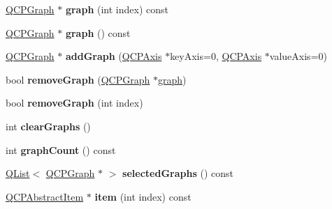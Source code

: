 \begin{DoxyCompactItemize}
\item 
\hyperlink{class_q_c_p_graph}{Q\+C\+P\+Graph} $\ast$ {\bfseries graph} (int index) const \hypertarget{class_q_custom_plot_a92870be7fd907ded84f97620b0189275}{}\label{class_q_custom_plot_a92870be7fd907ded84f97620b0189275}

\item 
\hyperlink{class_q_c_p_graph}{Q\+C\+P\+Graph} $\ast$ {\bfseries graph} () const \hypertarget{class_q_custom_plot_aa4284024fdbebf141788aa6d5d66d286}{}\label{class_q_custom_plot_aa4284024fdbebf141788aa6d5d66d286}

\item 
\hyperlink{class_q_c_p_graph}{Q\+C\+P\+Graph} $\ast$ {\bfseries add\+Graph} (\hyperlink{class_q_c_p_axis}{Q\+C\+P\+Axis} $\ast$key\+Axis=0, \hyperlink{class_q_c_p_axis}{Q\+C\+P\+Axis} $\ast$value\+Axis=0)\hypertarget{class_q_custom_plot_a81da9c07843d3e2beb1133dadb49acfc}{}\label{class_q_custom_plot_a81da9c07843d3e2beb1133dadb49acfc}

\item 
bool {\bfseries remove\+Graph} (\hyperlink{class_q_c_p_graph}{Q\+C\+P\+Graph} $\ast$\hyperlink{class_q_custom_plot_a6d3ed93c2bf46ab7fa670d66be4cddaf}{graph})\hypertarget{class_q_custom_plot_a903561be895fb6528a770d66ac5e6713}{}\label{class_q_custom_plot_a903561be895fb6528a770d66ac5e6713}

\item 
bool {\bfseries remove\+Graph} (int index)\hypertarget{class_q_custom_plot_a9554b3d2d5b10c0f884bd4010b6c192c}{}\label{class_q_custom_plot_a9554b3d2d5b10c0f884bd4010b6c192c}

\item 
int {\bfseries clear\+Graphs} ()\hypertarget{class_q_custom_plot_ab0f3abff2d2f7df3668b5836f39207fa}{}\label{class_q_custom_plot_ab0f3abff2d2f7df3668b5836f39207fa}

\item 
int {\bfseries graph\+Count} () const \hypertarget{class_q_custom_plot_a7d9b4d19114b2fde60f0233eeb0aa682}{}\label{class_q_custom_plot_a7d9b4d19114b2fde60f0233eeb0aa682}

\item 
\hyperlink{class_q_list}{Q\+List}$<$ \hyperlink{class_q_c_p_graph}{Q\+C\+P\+Graph} $\ast$ $>$ {\bfseries selected\+Graphs} () const \hypertarget{class_q_custom_plot_a70f84dc15f70b91c1fb3ff18e03ddaaf}{}\label{class_q_custom_plot_a70f84dc15f70b91c1fb3ff18e03ddaaf}

\item 
\hyperlink{class_q_c_p_abstract_item}{Q\+C\+P\+Abstract\+Item} $\ast$ {\bfseries item} (int index) const \hypertarget{class_q_custom_plot_a28c5bd1455d407654511bbe5e947916c}{}\label{class_q_custom_plot_a28c5bd1455d407654511bbe5e947916c}


\end{DoxyCompactItemize}
